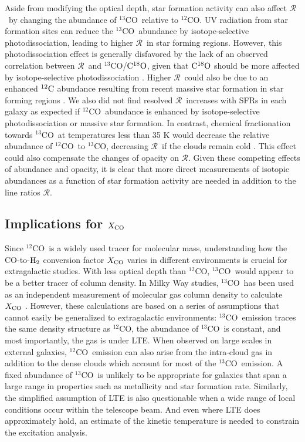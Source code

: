 \documentclass{emulateapj}
\def\ttco{\mbox{$^{13}$CO}}
\def\twco{\mbox{$^{12}$CO}}
\def\rtt{$\mathcal{R}$}
\begin{document}
Aside from modifying the optical depth, 
star formation activity can also affect \rtt \ by changing 
the abundance of \ttco \ relative to \twco.  
UV radiation from star formation sites can 
reduce the \ttco \ abundance by isotope-selective photodissociation, 
leading to higher \rtt \ in star forming regions.  
However, this photodissociation effect is generally disfavored by 
the lack of an observed correlation between \rtt \ and \ttco/$\rm C^{18}O$, 
given that $\rm C^{18}O$ should be more affected by isotope-selective photodissociation \citep{Paglione2001,Tan2011,Danielson2013}. 
Higher \rtt \ could also be due to an enhanced $\rm ^{12}C$ abundance 
resulting from recent massive star formation in star forming regions 
\citep{Casoli1991, Taniguchi1998}. 
We also did not find resolved \rtt \ increases with SFRs in each galaxy as expected 
if  \twco \ abundance is enhanced by isotope-selective photodissociation or massive star formation. 
In contrast, chemical fractionation towards \ttco \ at temperatures less than 35 K 
would decrease the relative abundance of \twco \ to \ttco, 
decreasing \rtt \ if the clouds remain cold \citep{Chu1983, Milam2005}. 
This effect could also compensate the  changes of opacity on \rtt. 
Given these competing effects of abundance and opacity, it is clear that more direct 
measurements of isotopic abundances
as a function of star formation activity are needed in addition to the line ratios \rtt.  

\subsection{Implications for $X_{\rm CO}$}
Since \twco \ is a widely used tracer for molecular mass, 
understanding how the CO-to-$\rm H_{2}$ conversion factor 
$X_{\rm CO}$ varies in different environments is crucial
for extragalactic studies. 
With less optical depth than \twco, \ttco \ 
would appear to be a better tracer of column density. 
In Milky Way studies, \ttco \ has been used as an independent measurement 
of molecular gas column density to calculate $X_{\rm CO}$ \citep[e.g.][]{Pineda2008, 
Roman-Duval2010}. 
However, these calculations are based on a series of assumptions 
that cannot easily be generalized to extragalactic environments:
\ttco \ emission traces the same density structure as \twco, 
the abundance of \ttco \ is constant, and most importantly, 
the gas is under LTE. 
When observed on large scales in external galaxies, 
\twco \ emission can also arise from the intra-cloud
gas in addition to the dense clouds which account for most of the \ttco \ emission. 
A fixed abundance of \ttco \ is unlikely to be appropriate for 
galaxies that span a large range in properties such as metallicity and star
formation rate. Similarly, the simplified assumption of LTE is also questionable 
when a wide range of local conditions occur within the telescope beam.
And even where LTE does approximately hold, an estimate of the 
kinetic temperature is needed to constrain the excitation analysis. 
\end{document}
